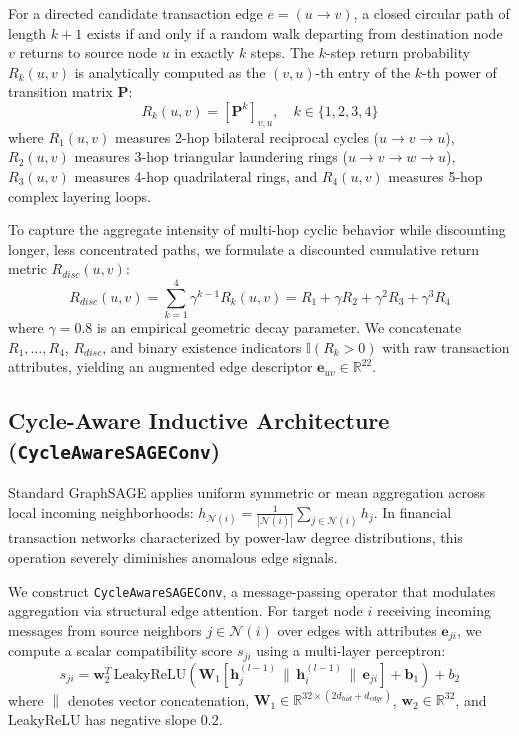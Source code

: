 \documentclass[10pt,twocolumn]{article}
\begin{document}
For a directed candidate transaction edge $e = (u \rightarrow v)$, a closed circular path of length $k+1$ exists if and only if a random walk departing from destination node $v$ returns to source node $u$ in exactly $k$ steps. The $k$-step return probability $R_k(u, v)$ is analytically computed as the $(v, u)$-th entry of the $k$-th power of transition matrix $\mathbf{P}$:
\begin{equation}
    R_k(u, v) = \left[ \mathbf{P}^k \right]_{v, u}, \quad k \in \{1, 2, 3, 4\}
    \label{eq:matrix_power}
\end{equation}
where $R_1(u, v)$ measures 2-hop bilateral reciprocal cycles ($u \rightarrow v \rightarrow u$), $R_2(u, v)$ measures 3-hop triangular laundering rings ($u \rightarrow v \rightarrow w \rightarrow u$), $R_3(u, v)$ measures 4-hop quadrilateral rings, and $R_4(u, v)$ measures 5-hop complex layering loops.

To capture the aggregate intensity of multi-hop cyclic behavior while discounting longer, less concentrated paths, we formulate a discounted cumulative return metric $R_{disc}(u, v)$:
\begin{equation}
    R_{disc}(u, v) = \sum_{k=1}^4 \gamma^{k-1} R_k(u, v) = R_1 + \gamma R_2 + \gamma^2 R_3 + \gamma^3 R_4
    \label{eq:discounted}
\end{equation}
where $\gamma = 0.8$ is an empirical geometric decay parameter. We concatenate $R_1, \dots, R_4$, $R_{disc}$, and binary existence indicators $\mathbb{I}(R_k > 0)$ with raw transaction attributes, yielding an augmented edge descriptor $\mathbf{e}_{uv} \in \mathbb{R}^{22}$.

\subsection{Cycle-Aware Inductive Architecture (\texttt{CycleAwareSAGEConv})}
Standard GraphSAGE applies uniform symmetric or mean aggregation across local incoming neighborhoods:
$h_{\mathcal{N}(i)} = \frac{1}{|\mathcal{N}(i)|} \sum_{j \in \mathcal{N}(i)} h_j$. In financial transaction networks characterized by power-law degree distributions, this operation severely diminishes anomalous edge signals. 

We construct \texttt{CycleAwareSAGEConv}, a message-passing operator that modulates aggregation via structural edge attention. For target node $i$ receiving incoming messages from source neighbors $j \in \mathcal{N}(i)$ over edges with attributes $\mathbf{e}_{ji}$, we compute a scalar compatibility score $s_{ji}$ using a multi-layer perceptron:
\begin{equation}
    s_{ji} = \mathbf{w}_2^T \, \text{LeakyReLU}\left(\mathbf{W}_1 \left[ \mathbf{h}_j^{(l-1)} \,\|\, \mathbf{h}_i^{(l-1)} \,\|\, \mathbf{e}_{ji} \right] + \mathbf{b}_1\right) + b_2
    \label{eq:attn_score}
\end{equation}
where $\|$ denotes vector concatenation, $\mathbf{W}_1 \in \mathbb{R}^{32 \times (2 d_{hid} + d_{edge})}$, $\mathbf{w}_2 \in \mathbb{R}^{32}$, and LeakyReLU has negative slope $0.2$.
\end{document}
